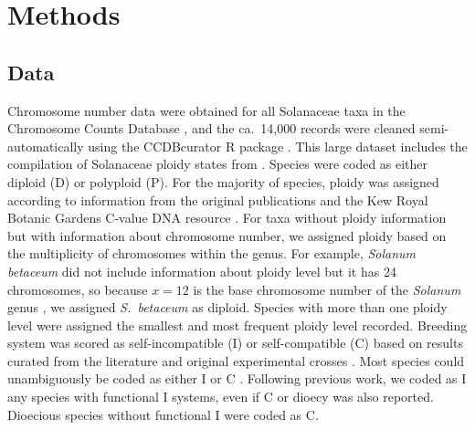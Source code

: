 \section{Methods}

\subsection{Data}


Chromosome number data were obtained for all Solanaceae taxa in the Chromosome Counts Database \citep[CCDB;][]{rice_2015}, and the ca.~14,000 records were cleaned semi-automatically using the CCDBcurator R package \citep{rivero_2019}. %
This large dataset includes the compilation of Solanaceae ploidy states from \citet{robertson_2011}.
Species were coded as either diploid (D) or polyploid (P).
For the majority of species, ploidy was assigned according to information from the original publications and the Kew Royal Botanic Gardens C-value DNA resource \citep{bennett_2005}.
For taxa without ploidy information but with information about chromosome number, we assigned ploidy based on the multiplicity of chromosomes within the genus.
For example, \textit{Solanum betaceum} did not include information about ploidy level but it has 24 chromosomes, so because $x=12$ is the base chromosome number of the \textit{Solanum} genus \citep{olmstead_2007}, we assigned \textit{S.~betaceum} as diploid. 
Species with more than one ploidy level were assigned the smallest and most frequent ploidy level recorded.
%
Breeding system was scored as self-incompatible (I) or self-compatible (C) based on results curated from the literature and  original experimental crosses \citep[as compiled in][]{igic_2006, goldberg_2010, robertson_2011, goldberg_2012}.
Most species could unambiguously be coded as either I or C \citep{raduski_2012}. %
Following previous work, we coded as I any species with functional I systems, even if C or dioecy was also reported.
Dioecious species without functional I were coded as C.


